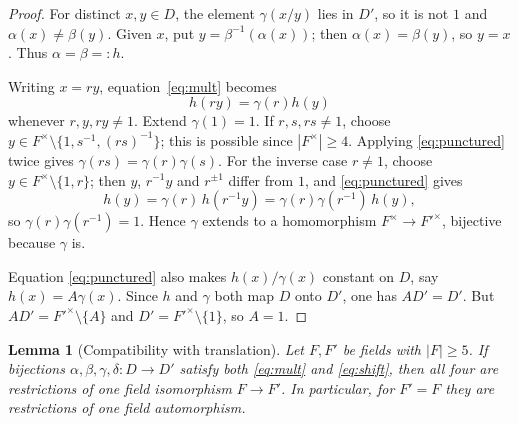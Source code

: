 \documentclass[11pt]{article}
\newtheorem{lemma}[theorem]{Lemma}
\theoremstyle{definition}
\theoremstyle{remark}
\begin{document}
\begin{proof}
For distinct $x,y\in D$, the element $\gamma(x/y)$ lies in $D'$, so it
is not $1$ and $\alpha(x)\ne\beta(y)$.  Given $x$, put
$y=\beta^{-1}(\alpha(x))$; then $\alpha(x)=\beta(y)$, so $y=x$.  Thus
$\alpha=\beta=:h$.

Writing $x=ry$, equation~\eqref{eq:mult} becomes
\begin{equation}
 h(ry)=\gamma(r)h(y)
 \label{eq:punctured}
\end{equation}
whenever $r,y,ry\ne1$.  Extend $\gamma(1)=1$.  If $r,s,rs\ne1$, choose
$y\in F^\times\setminus\{1,s^{-1},(rs)^{-1}\}$; this is possible since
$|F^\times|\geq4$.  Applying \eqref{eq:punctured} twice gives
$\gamma(rs)=\gamma(r)\gamma(s)$.  For the inverse case $r\ne1$, choose
$y\in F^\times\setminus\{1,r\}$; then $y$, $r^{-1}y$ and $r^{\pm1}$
differ from $1$, and \eqref{eq:punctured} gives
\[
 h(y)=\gamma(r)\,h(r^{-1}y)=\gamma(r)\gamma(r^{-1})\,h(y),
\]
so $\gamma(r)\gamma(r^{-1})=1$.  Hence $\gamma$ extends to a
homomorphism $F^\times\to F'^\times$, bijective because $\gamma$ is.

Equation \eqref{eq:punctured} also makes $h(x)/\gamma(x)$ constant on $D$, say
$h(x)=A\gamma(x)$.  Since $h$ and $\gamma$ both map $D$ onto $D'$, one
has $AD'=D'$.  But $AD'=F'^\times\setminus\{A\}$ and
$D'=F'^\times\setminus\{1\}$, so $A=1$.
\end{proof}

\begin{lemma}[Compatibility with translation]\label{lem:frobenius}
Let $F,F'$ be fields with $|F|\ge5$. If bijections
$\alpha,\beta,\gamma,\delta:D\to D'$ satisfy both \eqref{eq:mult} and
\eqref{eq:shift}, then all four are restrictions of one field isomorphism
$F\to F'$. In particular, for $F'=F$ they are restrictions of one field
automorphism.
\end{lemma}
\end{document}

